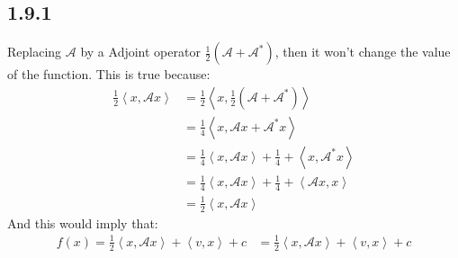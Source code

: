 \documentclass[]{article}
\begin{document}
    \subsection*{1.9.1}
        Replacing $\mathcal{A}$ by a Adjoint operator $\frac{1}{2}(\mathcal{A} + \mathcal{A}^*)$, then it won't change the value of the function. This is true because: 
        \begin{align*}\tag{1.9.1.1}\label{eqn:1.9.1.1}
            \frac{1}{2}\left\langle x, \mathcal{A}x \right\rangle &= 
            \frac{1}{2} \left\langle x, \frac{1}{2}(\mathcal{A} + \mathcal{A}^*) \right\rangle
            \\
            &= \frac{1}{4} \left\langle x, \mathcal{A}x + \mathcal{A}^*x \right\rangle
            \\
            &= \frac{1}{4}\left\langle x, \mathcal{A}x \right\rangle + \frac{1}{4} + \left\langle x, \mathcal{A}^*x \right\rangle
            \\
            &= \frac{1}{4}\left\langle x, \mathcal{A}x \right\rangle + \frac{1}{4} + \left\langle \mathcal{A}x, x \right\rangle
            \\
            &= \frac{1}{2}\left\langle x, \mathcal{A}x \right\rangle
        \end{align*}
        And this would imply that: 
        \begin{align*}\tag{1.9.1.2}\label{eqn:1.9.1.2}
            f(x) = \frac{1}{2}\left\langle x, \mathcal{A}x \right\rangle + \left\langle v, x \right\rangle + c 
            &= \frac{1}{2}\left\langle x, \mathcal{A}x \right\rangle + \left\langle v, x \right\rangle + c
        \end{align*}
\end{document}

